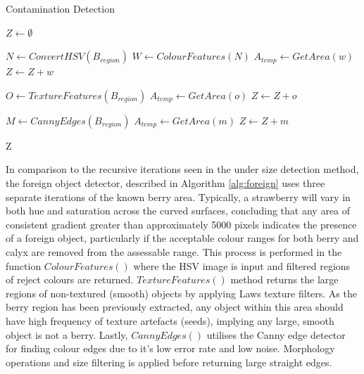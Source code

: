 \documentclass[fleqn,twoside,12pt]{report}
\begin{document}
\begin{algorithm}
	\caption{Contamination Detection}
	\begin{algorithmic}[1]
		\State $Z \gets \emptyset$
		
		\State $N \gets ConvertHSV(B_{region})$
		\State $ W \gets ColourFeatures(N)$
			\State $A_{temp} \gets GetArea(w)$
				\State $Z \gets Z + w$
			\EndIf
		\EndFor
			
		
		\State $O \gets TextureFeatures(B_{region})$
			\State $A_{temp} \gets GetArea(o)$
				\State $Z \gets Z + o$
			\EndIf
		\EndFor
		
		
		\State $M\gets CannyEdges(B_{region})$
			\State $A_{temp} \gets GetArea(m)$
				\State $Z \gets Z + m$
			\EndIf
		\EndFor
		
		
		\State \Return Z
		\label{alg:foreign}
		\EndProcedure
	\end{algorithmic}
\end{algorithm}


In comparison to the recursive iterations seen in the under size detection method, the foreign object detector, described in Algorithm \ref{alg:foreign} uses three separate iterations of the known berry area. Typically, a strawberry will vary in both hue and saturation across the curved surfaces, concluding that any area of consistent gradient greater than approximately 5000 pixels indicates the presence of a foreign object, particularly if the acceptable colour ranges for both berry and calyx are removed from the assessable range. This process is performed in the function $ColourFeatures()$ where the HSV image is input and filtered regions of reject colours are returned. $TextureFeatures()$ method returns the large regions of non-textured (smooth) objects by applying Laws texture filters. As the berry region has been previously extracted, any object within this area should have high frequency of texture artefacts (seeds), implying any large, smooth object is not a berry. Lastly, $CannyEdges()$ utilises the Canny edge detector for finding colour edges due to it's low error rate and low noise. Morphology operations and size filtering is applied before returning large straight edges. 
\end{document}
